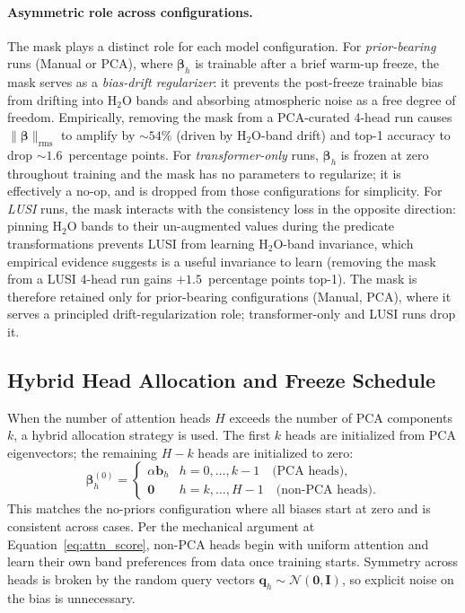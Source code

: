 \documentclass[11pt]{report}
\begin{document}
\paragraph{Asymmetric role across configurations.}
The mask plays a distinct role for each model configuration. For \emph{prior-bearing} runs (Manual or PCA), where $\bm{\beta}_h$ is trainable after a brief warm-up freeze, the mask serves as a \emph{bias-drift regularizer}: it prevents the post-freeze trainable bias from drifting into H$_2$O bands and absorbing atmospheric noise as a free degree of freedom. Empirically, removing the mask from a PCA-curated 4-head run causes $\|\bm{\beta}\|_{\text{rms}}$ to amplify by $\sim 54\%$ (driven by H$_2$O-band drift) and top-1 accuracy to drop $\sim 1.6$~percentage points. For \emph{transformer-only} runs, $\bm{\beta}_h$ is frozen at zero throughout training and the mask has no parameters to regularize; it is effectively a no-op, and is dropped from those configurations for simplicity. For \emph{LUSI} runs, the mask interacts with the consistency loss in the opposite direction: pinning H$_2$O bands to their un-augmented values during the predicate transformations prevents LUSI from learning H$_2$O-band invariance, which empirical evidence suggests is a useful invariance to learn (removing the mask from a LUSI 4-head run gains $+1.5$~percentage points top-1). The mask is therefore retained only for prior-bearing configurations (Manual, PCA), where it serves a principled drift-regularization role; transformer-only and LUSI runs drop it.

\subsection{Hybrid Head Allocation and Freeze Schedule}
\label{sec:hybrid_heads}

When the number of attention heads $H$ exceeds the number of PCA components $k$, a hybrid allocation strategy is used. The first $k$ heads are initialized from PCA eigenvectors; the remaining $H - k$ heads are initialized to zero:
\begin{equation}
\bm{\beta}_h^{(0)} = \begin{cases}
\alpha \mathbf{b}_h & h = 0, \ldots, k-1 \quad \text{(PCA heads)}, \\
\mathbf{0} & h = k, \ldots, H-1 \quad \text{(non-PCA heads)}.
\end{cases}
\label{eq:hybrid_init}
\end{equation}
This matches the no-priors configuration where all biases start at zero and is consistent across cases. Per the mechanical argument at Equation~\ref{eq:attn_score}, non-PCA heads begin with uniform attention and learn their own band preferences from data once training starts. Symmetry across heads is broken by the random query vectors $\mathbf{q}_h \sim \mathcal{N}(\mathbf{0}, \mathbf{I})$, so explicit noise on the bias is unnecessary.
\end{document}
